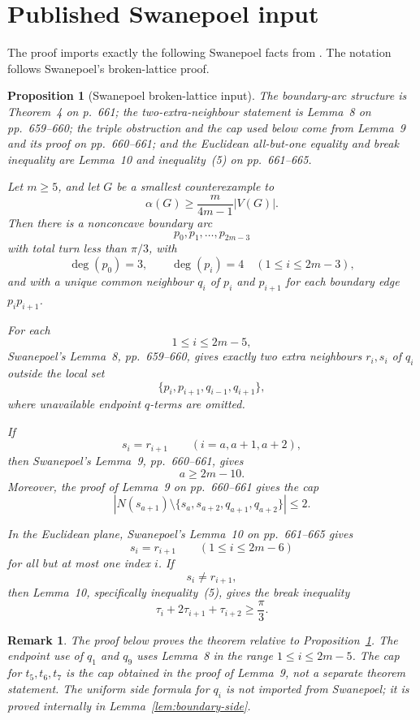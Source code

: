 \documentclass[11pt]{article}
\theoremstyle{plain}
\newtheorem{proposition}{Proposition}
\newtheorem{remark}{Remark}
\numberwithin{equation}{section}
\begin{document}
\section{Published Swanepoel input}

The proof imports exactly the following Swanepoel facts from \cite{Swanepoel2002}. The notation follows Swanepoel's broken-lattice proof.

\begin{proposition}[Swanepoel broken-lattice input]\label{prop:SwanepoelInput}
The boundary-arc structure is Theorem~4 on p.~661; the two-extra-neighbour statement is Lemma~8 on pp.~659--660; the triple obstruction and the cap used below come from Lemma~9 and its proof on pp.~660--661; and the Euclidean all-but-one equality and break inequality are Lemma~10 and inequality~(5) on pp.~661--665.

Let $m\ge 5$, and let $G$ be a smallest counterexample to
\[
 \alpha(G)\ge \frac{m}{4m-1}|V(G)|.
\]
Then there is a nonconcave boundary arc
\[
 p_0,p_1,\ldots,p_{2m-3}
\]
with total turn less than $\pi/3$, with
\[
 \deg(p_0)=3,
 \qquad
 \deg(p_i)=4\quad(1\le i\le 2m-3),
\]
and with a unique common neighbour $q_i$ of $p_i$ and $p_{i+1}$ for each boundary edge $p_ip_{i+1}$.

For each
\[
 1\le i\le 2m-5,
\]
Swanepoel's Lemma~8, pp.~659--660, gives exactly two extra neighbours $r_i,s_i$ of $q_i$ outside the local set
\[
 \{p_i,p_{i+1},q_{i-1},q_{i+1}\},
\]
where unavailable endpoint $q$-terms are omitted.

If
\[
 s_i=r_{i+1}\qquad(i=a,a+1,a+2),
\]
then Swanepoel's Lemma~9, pp.~660--661, gives
\[
 a\ge 2m-10.
\]
Moreover, the proof of Lemma~9 on pp.~660--661 gives the cap
\[
 \left|N(s_{a+1})\setminus\{s_a,s_{a+2},q_{a+1},q_{a+2}\}\right|\le 2.
\]

In the Euclidean plane, Swanepoel's Lemma~10 on pp.~661--665 gives
\[
 s_i=r_{i+1}\qquad(1\le i\le 2m-6)
\]
for all but at most one index $i$. If
\[
 s_i\ne r_{i+1},
\]
then Lemma~10, specifically inequality~(5), gives the break inequality
\[
 \tau_i+2\tau_{i+1}+\tau_{i+2}\ge \frac{\pi}{3}.
\]
\end{proposition}

\begin{remark}
The proof below proves the theorem relative to Proposition~\ref{prop:SwanepoelInput}. The endpoint use of $q_1$ and $q_9$ uses Lemma~8 in the range $1\le i\le 2m-5$. The cap for $t_5,t_6,t_7$ is the cap obtained in the proof of Lemma~9, not a separate theorem statement. The uniform side formula for $q_i$ is not imported from Swanepoel; it is proved internally in Lemma~\ref{lem:boundary-side}.
\end{remark}
\end{document}
